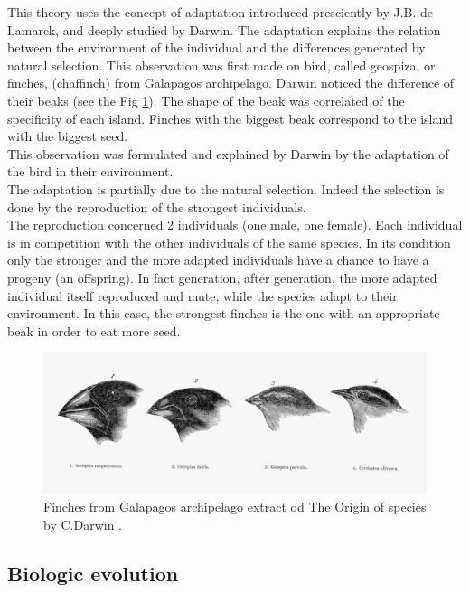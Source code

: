 This theory uses the concept of adaptation introduced presciently by J.B. de Lamarck, and deeply studied by Darwin. The adaptation explains the relation between the environment of the individual and the differences generated by natural selection. This observation was first made on bird, called geospiza, or finches, (chaffinch) from Galapagos archipelago. Darwin noticed the difference of their beaks (see the Fig \ref{fig:finchesFromGalapagos}). The shape of the beak was correlated of the specificity of each island. Finches with the biggest beak correspond to the island with the biggest seed. \\
This observation was formulated and explained by Darwin by the adaptation of the bird in their environment.\\ The adaptation is partially due to the natural selection. Indeed the selection is done by the reproduction of the strongest individuals.\\
The reproduction concerned 2 individuals (one male, one female). Each individual is in competition with the other individuals of the same species.  In its condition only the stronger and  the more adapted individuals   have a chance to have a progeny (an offspring). In fact generation, after generation, the more adapted individual itself reproduced and mute, while the species adapt to their environment.
In this case, the strongest finches is the one with an appropriate beak in order to eat more seed. 
\begin{figure}[t!]
   \includegraphics[width=\linewidth]{img/finchesFromGalapagos.jpeg}
  \caption{ Finches from Galapagos archipelago extract od The Origin of species by C.Darwin .}\label{fig:finchesFromGalapagos}
  \endminipage\hfill
\end{figure}

\subsection{Biologic evolution }\label{subsec:BioEvolv}

